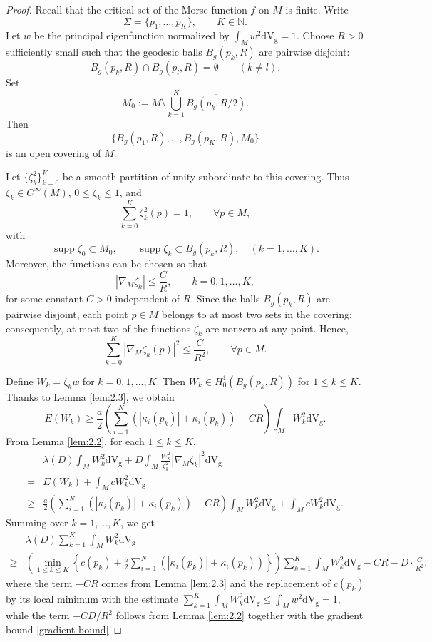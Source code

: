 \documentclass[10pt,a4paper]{amsart}
\newcommand{\V}{\mathrm{d} \mathrm{V_g}}
\newcommand{\grad}{\nabla_M}
\newcommand{\red}{\textcolor[rgb]{1.00,0.00,0.00}}
\begin{document}
\begin{proof}
Recall that the critical set of the Morse function \(f\) on \(M\) is finite. Write
\[
\Sigma=\{p_1,\ldots,p_K\}, \qquad K\in\mathbb N.
\]
Let \(w\) be the principal eigenfunction normalized by \(\int_M w^2 \V=1\). Choose \(R>0\) sufficiently small such that the geodesic balls \(B_g(p_k,R)\) are pairwise disjoint:
\[
B_g(p_k,R)\cap B_g(p_l,R)=\emptyset \qquad (k\neq l).
\]
Set
\[
M_0:=M\setminus \bigcup_{k=1}^K \overline{B_g(p_k,R/2)} .
\]
Then
\[
\{B_g(p_1,R),\ldots,B_g(p_K,R),M_0\}
\]
is an open covering of \(M\).

Let
$\{\zeta_k^2\}_{k=0}^K$
be a smooth partition of unity subordinate to this covering. Thus
\(\zeta_k\in C^\infty(M)\), \(0\leq \zeta_k\leq 1\), and
\[
\sum_{k=0}^K \zeta_k^2(p)=1,
\qquad \forall p\in M,
\]
with
\[
\operatorname{supp} \zeta_0\subset M_0,
\qquad
\operatorname{supp} \zeta_k\subset B_g(p_k,R),
\quad (k=1,\ldots,K).
\]
Moreover, the functions can be chosen so that
\[
|\nabla_M\zeta_k|\leq \frac{C}{R},
\qquad k=0,1,\ldots,K,
\]
for some constant \(C>0\) independent of \(R\).  Since the balls \(B_g(p_k,R)\) are pairwise disjoint, each point \(p\in M\) belongs to at most two sets in the covering; consequently, at most two of the functions \(\zeta_k\) are nonzero at any point. Hence,
\begin{equation}\label{gradient bound}
\sum_{k=0}^K|\nabla_M\zeta_k(p)|^2
\leq\frac{C}{R^2},
\qquad \forall p\in M.
\end{equation}


Define \(W_k = \zeta_k w\) for \(k = 0, 1, \ldots, K\). Then $W_k\in H_0^1(B_g(p_k,R))$ for \(1\leq k\le K\).
Thanks to Lemma \ref{lem:2.3}, we obtain
\[
E(W_k) \geq \frac{a}{2} \left( \sum_{i=1}^N \left( |\kappa_i(p_k)| + \kappa_i(p_k) \right) - C R \right) \int_M W_k^2 \V.
\]
From Lemma \ref{lem:2.2}, for each \(1\le k\le K\),
\begin{align*}
   & \lambda(D) \int_M W_k^2 \V + D \int_M \frac{W_k^2}{\zeta_k^2} |\grad \zeta_k|^2 \V\\=&
E(W_k) +\int_M    c W_k^2   \V \\
\ge&
   \frac{a}{2} \left( \sum_{i=1}^N \left( |\kappa_i(p_k)| + \kappa_i(p_k) \right) - C R \right) \int_M W_k^2 \V
   +\int_M  c W_k^2 \V. 
\end{align*}
Summing over $k=1,...,K$, we get
\begin{align}
&\lambda(D) \sum_{k=1}^K \int_M W_k^2 \V \label{I:lb} \\
\geq& \left( \min_{1 \leq k \leq K} \left\{ c(p_k) + \frac{a}{2} \sum_{i=1}^N (|\kappa_i(p_k)| + \kappa_i(p_k)) \right\}\right)\sum_{k=1}^K \int_M W_k^2 \V  - C R  - D \cdot \frac{C}{R^2}.\nonumber
\end{align}
where the term \(-CR\) comes from Lemma \ref{lem:2.3} and the replacement of \(c(p_k)\) by its local minimum with the estimate \(\sum_{k=1}^K\int_M W_k^2\V\le \int_M w^2\V=1\), while the term \(-C D/R^2\) follows from Lemma \ref{lem:2.2} together with the gradient bound \eqref{gradient bound}


\end{proof}
\end{document}
